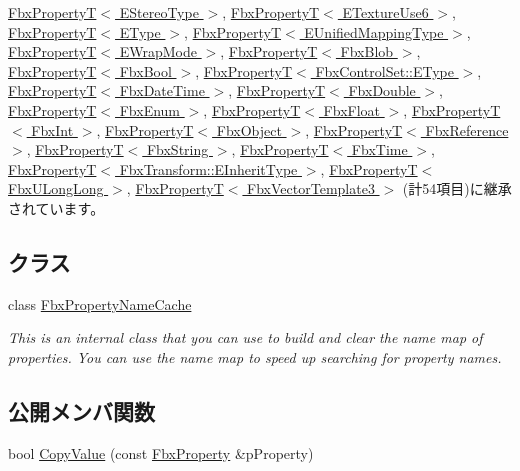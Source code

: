 \hyperlink{class_fbx_property_t}{Fbx\+Property\+T$<$ E\+Stereo\+Type $>$}, \hyperlink{class_fbx_property_t}{Fbx\+Property\+T$<$ E\+Texture\+Use6 $>$}, \hyperlink{class_fbx_property_t}{Fbx\+Property\+T$<$ E\+Type $>$}, \hyperlink{class_fbx_property_t}{Fbx\+Property\+T$<$ E\+Unified\+Mapping\+Type $>$}, \hyperlink{class_fbx_property_t}{Fbx\+Property\+T$<$ E\+Wrap\+Mode $>$}, \hyperlink{class_fbx_property_t}{Fbx\+Property\+T$<$ Fbx\+Blob $>$}, \hyperlink{class_fbx_property_t}{Fbx\+Property\+T$<$ Fbx\+Bool $>$}, \hyperlink{class_fbx_property_t}{Fbx\+Property\+T$<$ Fbx\+Control\+Set\+::\+E\+Type $>$}, \hyperlink{class_fbx_property_t}{Fbx\+Property\+T$<$ Fbx\+Date\+Time $>$}, \hyperlink{class_fbx_property_t}{Fbx\+Property\+T$<$ Fbx\+Double $>$}, \hyperlink{class_fbx_property_t}{Fbx\+Property\+T$<$ Fbx\+Enum $>$}, \hyperlink{class_fbx_property_t}{Fbx\+Property\+T$<$ Fbx\+Float $>$}, \hyperlink{class_fbx_property_t}{Fbx\+Property\+T$<$ Fbx\+Int $>$}, \hyperlink{class_fbx_property_t}{Fbx\+Property\+T$<$ Fbx\+Object $>$}, \hyperlink{class_fbx_property_t_3_01_fbx_reference_01_4}{Fbx\+Property\+T$<$ Fbx\+Reference $>$}, \hyperlink{class_fbx_property_t}{Fbx\+Property\+T$<$ Fbx\+String $>$}, \hyperlink{class_fbx_property_t}{Fbx\+Property\+T$<$ Fbx\+Time $>$}, \hyperlink{class_fbx_property_t}{Fbx\+Property\+T$<$ Fbx\+Transform\+::\+E\+Inherit\+Type $>$}, \hyperlink{class_fbx_property_t}{Fbx\+Property\+T$<$ Fbx\+U\+Long\+Long $>$}, \hyperlink{class_fbx_property_t}{Fbx\+Property\+T$<$ Fbx\+Vector\+Template3 $>$} (計54項目)に継承されています。

\subsection*{クラス}
\begin{DoxyCompactItemize}
\item 
class \hyperlink{class_fbx_property_1_1_fbx_property_name_cache}{Fbx\+Property\+Name\+Cache}
\begin{DoxyCompactList}\small\item\em This is an internal class that you can use to build and clear the name map of properties. You can use the name map to speed up searching for property names. \end{DoxyCompactList}\end{DoxyCompactItemize}
\subsection*{公開メンバ関数}
\begin{DoxyCompactItemize}
\item 
bool \hyperlink{class_fbx_property_aadee6392924e168e7cfea5225148893a}{Copy\+Value} (const \hyperlink{class_fbx_property}{Fbx\+Property} \&p\+Property)
\end{DoxyCompactItemize}
